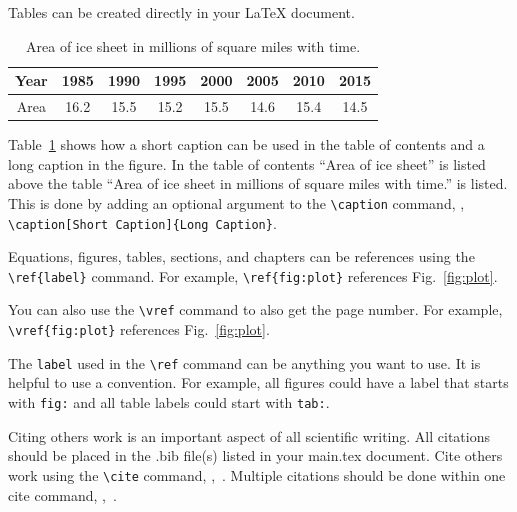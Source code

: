 \label{Sect:tabs}
Tables can be created directly in your \LaTeX{} document.
\begin{table}[htbp]
  \centering
  \caption[Area of ice sheet]{Area of ice sheet in millions of square miles with time.}
  \label{tab:ice}
  \begin{tabular}{c | ccccccc}
    Year  & 1985 & 1990 & 1995 & 2000 & 2005 & 2010 & 2015\\\hline
    Area  & 16.2 & 15.5   & 15.2  & 15.5  & 14.6 & 15.4 & 14.5 
  \end{tabular}
\end{table}

Table~\ref{tab:ice} shows how a short caption can be used in the table of contents and a long caption in the figure.  In the table of contents ``Area of ice sheet'' is listed above the table ``Area of ice sheet in millions of square miles with time.'' is listed.  This is done by adding an optional argument to the \verb|\caption| command, \ie, \verb|\caption[Short Caption]{Long Caption}|.

\label{Sect:ref_cite}

\label{Sect:ref}
Equations, figures, tables, sections, and chapters can be references using the \verb|\ref{label}| command.  For example, \verb|\ref{fig:plot}| references Fig.~\ref{fig:plot}.  

You can also use the \verb|\vref| command to also get the page number.  For example, \verb|\vref{fig:plot}| references Fig.~\vref{fig:plot}.

The \verb|label| used in the \verb|\ref| command can be anything you want to use. It is helpful to use a convention.  For example, all figures could have a label that starts with \verb|fig:| and all table labels could start with \verb|tab:|.

\label{Sect:cite}
Citing others work is an important aspect of all scientific writing.  All citations should be placed in the .bib file(s) listed in your main.tex document.  Cite others work using the \verb|\cite| command, \eg,~\cite{owkes_mesh-decoupled_2015}.  Multiple citations should be done within one cite command, \eg,~\cite{desjardins_direct_2013,owkes_discontinuous_2013,owkes_computational_2014}.  




